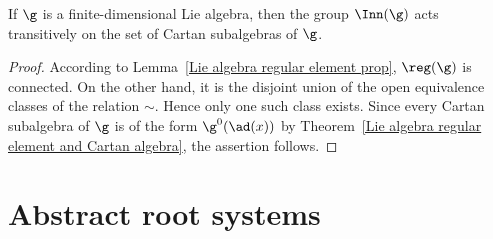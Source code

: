 \begin{proposition}\label{Lie algebra inn(g) acts transitive on Cartan}
If $\g$ is a finite-dimensional Lie algebra, then the group $\Inn(\g)$ acts transitively on the set of Cartan subalgebras of $\g$.
\end{proposition}
\begin{proof}
According to Lemma~\ref{Lie algebra regular element prop}, $\reg(\g)$ is connected. On the other hand, it is the disjoint union of the open equivalence classes of the relation $\sim$. Hence only one such class exists. Since every Cartan subalgebra of $\g$ is of the form $\g^0(\ad(x))$ by Theorem~\ref{Lie algebra regular element and Cartan algebra}, the assertion follows.
\end{proof}
\section{Abstract root systems}
